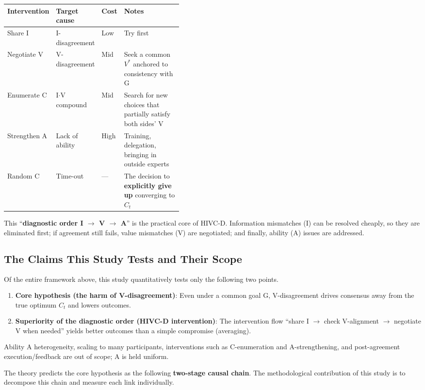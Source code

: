 \documentclass[11pt]{article}
\newcommand{\Ct}{\ensuremath{C_t}}
\begin{document}
\begin{longtable}{@{}l l l p{0.42\linewidth}@{}}
\toprule
Intervention & Target cause & Cost & Notes \\
\midrule
Share I & I-disagreement & Low & Try first \\
Negotiate V & V-disagreement & Mid & Seek a common $V^*$ anchored to consistency with G \\
Enumerate C & I$\cdot$V compound & Mid & Search for new choices that partially satisfy both sides' V \\
Strengthen A & Lack of ability & High & Training, delegation, bringing in outside experts \\
Random C & Time-out & --- & The decision to \textbf{explicitly give up} converging to \Ct{} \\
\bottomrule
\end{longtable}

This ``\textbf{diagnostic order I $\to$ V $\to$ A}'' is the practical core of HIVC-D. Information mismatches (I) can be resolved cheaply, so they are eliminated first; if agreement still fails, value mismatches (V) are negotiated; and finally, ability (A) issues are addressed.

\subsection{The Claims This Study Tests and Their Scope}

Of the entire framework above, this study quantitatively tests only the following two points.

\begin{enumerate}[nosep]
  \item \textbf{Core hypothesis (the harm of V-disagreement)}: Even under a common goal G, V-disagreement drives consensus away from the true optimum \Ct{} and lowers outcomes.
  \item \textbf{Superiority of the diagnostic order (HIVC-D intervention)}: The intervention flow ``share I $\to$ check V-alignment $\to$ negotiate V when needed'' yields better outcomes than a simple compromise (averaging).
\end{enumerate}

Ability A heterogeneity, scaling to many participants, interventions such as C-enumeration and A-strengthening, and post-agreement execution/feedback are out of scope; A is held uniform.

The theory predicts the core hypothesis as the following \textbf{two-stage causal chain}. The methodological contribution of this study is to decompose this chain and measure each link individually.
\end{document}
